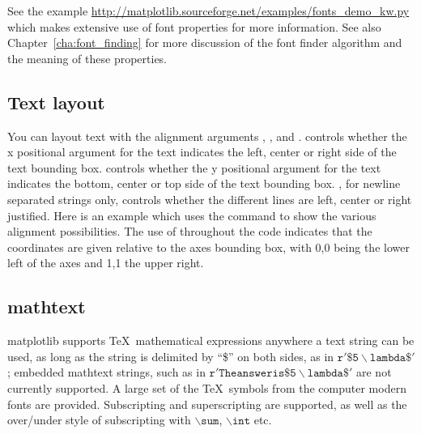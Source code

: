 \documentclass[twoside]{book}
\begin{document}
\noindent See the example
\url{http://matplotlib.sourceforge.net/examples/fonts_demo_kw.py}
which makes extensive use of font properties for more information.
See also Chapter~\ref{cha:font_finding} for more discussion of the
font finder algorithm and the meaning of these properties.

\subsection{Text layout}
\label{sec:text_layout}

You can layout text with the alignment arguments
, , and
.   controls whether
the x positional argument for the text indicates the left, center or
right side of the text bounding box.  controls
whether the y positional argument for the text indicates the bottom,
center or top side of the text bounding box.  ,
for newline separated strings only, controls whether the different
lines are left, center or right justified.  Here is an example which
uses the  command to show the various alignment
possibilities.  The use of  throughout
the code indicates that the coordinates are given relative to the axes
bounding box, with 0,0 being the lower left of the axes and 1,1 the
upper right.







\subsection{mathtext}
\label{sec:mathtext}

matplotlib supports \TeX\ mathematical expressions anywhere a text
string can be used, as long as the string is delimited by ``\$'' on
both sides, as in $\mathtt{r'\$5\backslash lambda\$'}$; embedded
mathtext strings, such as in $\mathtt{r'The answer is \$5\backslash
  lambda\$'}$ are not currently supported. A large set of the \TeX\ 
symbols from the computer modern fonts are provided.  Subscripting and
superscripting are supported, as well as the over/under style of
subscripting with $\mathtt{\backslash sum}$, $\mathtt{\backslash int}$
etc.
\end{document}
